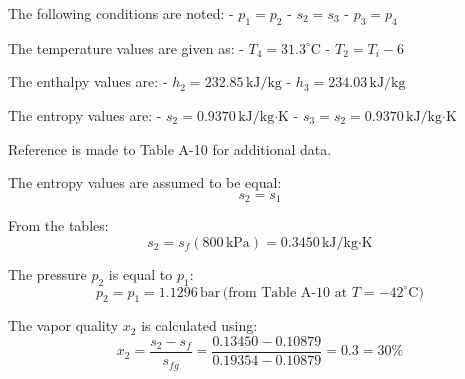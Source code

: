 The following conditions are noted:  
- \( p_1 = p_2 \)  
- \( s_2 = s_3 \)  
- \( p_3 = p_4 \)  

The temperature values are given as:  
- \( T_4 = 31.3^\circ\text{C} \)  
- \( T_2 = T_i - 6 \)  

The enthalpy values are:  
- \( h_2 = 232.85 \, \text{kJ/kg} \)  
- \( h_3 = 234.03 \, \text{kJ/kg} \)  

The entropy values are:  
- \( s_2 = 0.9370 \, \text{kJ/kg·K} \)  
- \( s_3 = s_2 = 0.9370 \, \text{kJ/kg·K} \)  

Reference is made to Table A-10 for additional data.

The entropy values are assumed to be equal:  
\[
s_2 = s_1
\]

From the tables:  
\[
s_2 = s_f(800 \, \text{kPa}) = 0.3450 \, \text{kJ/kg·K}
\]

The pressure \( p_2 \) is equal to \( p_1 \):  
\[
p_2 = p_1 = 1.1296 \, \text{bar} \, \text{(from Table A-10 at } T = -42^\circ\text{C})
\]

The vapor quality \( x_2 \) is calculated using:  
\[
x_2 = \frac{s_2 - s_f}{s_{fg}} = \frac{0.13450 - 0.10879}{0.19354 - 0.10879} = 0.3 = 30\%
\]